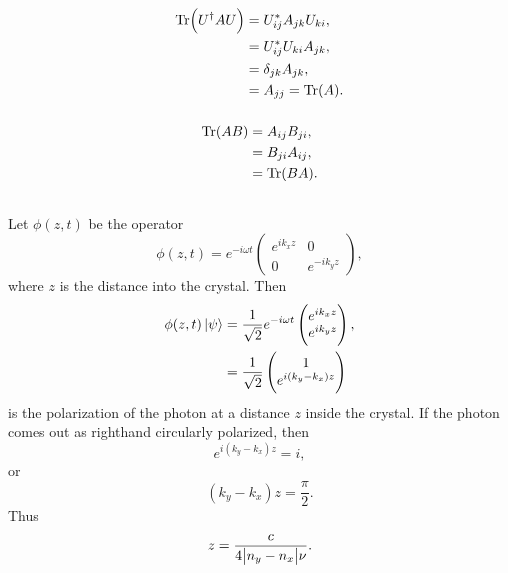 \documentclass[a4paper,12pt,twoside]{article}
\begin{document}
\subsection{}%
\subsubsection{}
\begin{align}
	\Tr(U^\dagger A U) &= U^*_{ij}A_{jk}U_{ki},\\
	&= U^*_{ij}U_{ki}A_{jk},\\
	&= \delta_{jk} A_{jk},\\
	&= A_{jj} = \Tr(A).
\end{align}
\subsubsection{}
\begin{align}
	\Tr(AB) &= A_{ij}B_{ji},\\
	&= B_{ji}A_{ij},\\
	&= \Tr(BA).
\end{align}
\subsection{}%
Let $\phi(z,t)$ be the operator
\begin{equation}
	\phi(z,t) = e^{-i\omega t} \begin{pmatrix}
		e^{ik_x z} & 0 \\
		0 & e^{-ik_y z}
	\end{pmatrix},
\end{equation}
where $z$ is the distance into the crystal.
Then
\begin{align}
	\phi(z,t)\ket{\psi} &= \frac{1}{\sqrt{2}} e^{-i\omega t} \begin{pmatrix}
		e^{ik_x z}\\ e^{ik_y z}
	\end{pmatrix},\\
	&= \frac{1}{\sqrt{2}} \begin{pmatrix}
		1\\ e^{i(k_y-k_x) z}
	\end{pmatrix}
\end{align}
is the polarization of the photon at a distance $z$ inside the crystal.
If the photon comes out as righthand circularly polarized, then
\begin{equation}
	e^{i(k_y-k_x)z} = i,
\end{equation}
or
\begin{equation}
	(k_y-k_x)z = \frac{\pi}{2}.
\end{equation}
Thus
\begin{equation}
	z = \frac{c}{4\abs{n_y-n_x} \nu}.
\end{equation}
\end{document}
